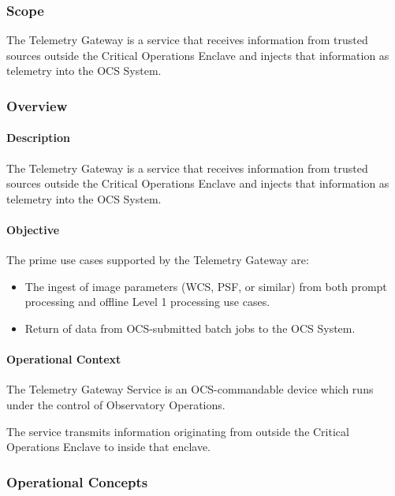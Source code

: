 \subsubsection{Scope}

The Telemetry Gateway is a service that receives information from
trusted sources outside the Critical Operations Enclave and injects
that information as telemetry into the OCS System.

\subsubsection{Overview}

\paragraph{Description}

The Telemetry Gateway is a service that receives information from
trusted sources outside the Critical Operations Enclave and injects
that information as telemetry into the OCS System.

\paragraph{Objective}

The prime use cases supported by the Telemetry Gateway are:

\begin{itemize}
\item The ingest of image parameters (WCS, PSF, or similar) from both prompt
processing and offline Level 1 processing use cases.
\item Return of data from OCS-submitted batch jobs to the OCS System.
\end{itemize}

\paragraph{Operational Context}

The Telemetry Gateway Service is an OCS-commandable device which runs
under the control of Observatory Operations.

The service transmits information originating from outside the Critical Operations
Enclave to inside that enclave.

\subsubsection{Operational Concepts}

